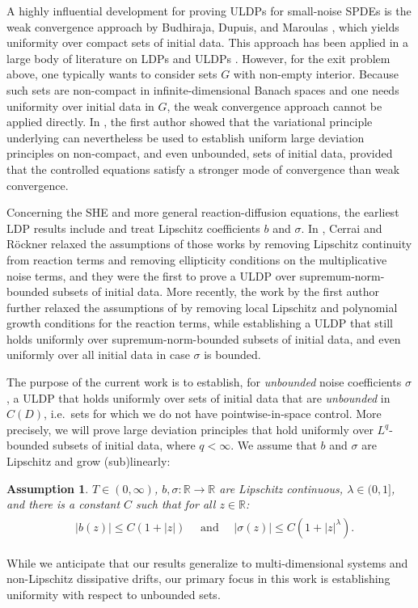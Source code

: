 \documentclass{amsart}
\theoremstyle{plain}
\theoremstyle{remark}
\theoremstyle{plain}
\newtheorem{assumption}[theorem]{Assumption}
\numberwithin{equation}{section}
\newcommand{\R}{\mathbb{R}}
\newcommand{\col}{\colon}
\begin{document}
A highly influential development for proving ULDPs for small-noise SPDEs is the weak convergence approach by Budhiraja, Dupuis, and Maroulas \cite{BDM08}, which yields uniformity over compact sets of initial data. This approach has been applied in a large body of literature on LDPs \cite{LDP1,LDP2,LDP3,LDP4,LDP5,LDP6,LDP7,LDP8,LDP9,LDP10,LDP11,LDP12,LDP13,LDP14,LDP15,LDP16,LDP17,LDP18,LDP19,LDP20,LDP21,LDP22,LDP23} and ULDPs \cite{ULDP1,ULDP2,ULDP3,ULDP4}.  However, for the exit problem above, one typically wants to consider sets $G$ with  non-empty interior. Because such sets are non-compact in infinite-dimensional Banach spaces and one needs uniformity over initial data in $G$,   the weak convergence approach cannot be applied directly. 
In \cite{Salins19equivalences}, the first  author showed that the variational principle underlying \cite{BDM08} can nevertheless be used to establish uniform large deviation principles on non-compact, and even unbounded, sets of initial data, provided that the controlled equations satisfy a stronger mode of convergence than weak convergence. 


Concerning the SHE and more general reaction-diffusion equations,  the earliest LDP results include \cite{freidlin88,Sowers92,KX96} and treat Lipschitz coefficients $b$ and $\sigma$.  
In \cite{CR04}, Cerrai and R\"ockner relaxed the assumptions of those works by removing Lipschitz
continuity from reaction terms and removing  ellipticity conditions on the multiplicative noise terms, and they were the first to prove a ULDP over supremum-norm-bounded subsets of initial data.  
More recently, the work \cite{Salins21reacdiff} by the first author further relaxed the assumptions of \cite{CR04}  by removing  local Lipschitz
 and polynomial growth conditions for the reaction terms, while establishing a  ULDP that still holds   uniformly over supremum-norm-bounded subsets of initial data, and even uniformly over all initial data in case $\sigma$ is bounded. 


 The purpose of the current work is to establish, for \emph{unbounded} noise coefficients $\sigma$, a ULDP that holds uniformly over sets of initial data that are \emph{unbounded} in $C(D)$, i.e.\ sets for which we do not have pointwise-in-space control. 
More precisely, we will prove large deviation principles that hold uniformly over $L^q$-bounded subsets of initial data, where $q<\infty$. We assume that  $b$ and $\sigma$ are Lipschitz and grow (sub)linearly:  
\begin{assumption}\label{asm}
$T\in(0,\infty)$, $b,\sigma\col  \R\to \R$ are Lipschitz continuous, $\lambda\in(0,1]$, and there is a constant $C$ such that for all  $z\in \R$:
\begin{align}\label{eq:growth}
\begin{split}
  &|b(z)|\leq C(1+|z|)\quad \text{ and }\quad |\sigma(z)|\leq C(1+|z|^\lambda).
\end{split}
\end{align}
\end{assumption}
While we anticipate that our results generalize to multi-dimensional systems and non-Lipschitz dissipative drifts, our primary focus in this work is establishing uniformity with respect to unbounded sets. 
 
\end{document}
